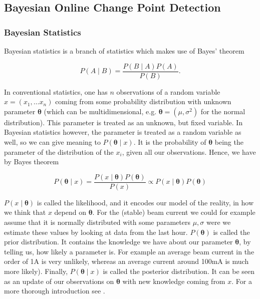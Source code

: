 \documentclass[12pt,a4paper]{article}
\begin{document}
\hypertarget{bayesian-online-changepoint-detection}{
\subsection{Bayesian Online Change Point Detection}\label{bayesian-online-changepoint-detection}}

\subsubsection{Bayesian Statistics}
Bayesian statistics is a branch of statistics which makes use of Bayes' theorem

\begin{equation*}
P\left(A \mid B\right)=\frac{P\left(B \mid A\right)P\left(A\right)}{P\left(B\right)}.
\end{equation*}

In conventional statistics, one has $n$ observations of a random variable $ x = \left(x_1, \dots x_n\right)$ coming from some probability distribution with unknown parameter $\bm{{\theta}}$ (which can be multidimensional, e.g. $\bm{{\theta}}=\left(\mu, \sigma^2 \right)$ for the normal distribution). This parameter is treated as an unknown, but fixed variable. In Bayesian statistics however, the parameter is treated as a random variable as well, so we can give meaning to $P\left(\bm{{\theta}} \mid x\right)$. It is the probability of $\bm{{\theta}}$ being the parameter of the distribution of the $x_i$, given all our observations. Hence, we have by Bayes theorem

\begin{equation} \label{eq:posterior_distribution}
	P\left(\bm {{\theta}} \mid x\right)=\frac{P\left(x \mid \bm{{\theta}}\right)P\left(\bm {{\theta}}\right)}{P\left(x\right)} \propto P\left(x \mid \bm{{\theta}}\right)P\left(\bm {{\theta}}\right)
\end{equation}

$P\left(x \mid \bm{{\theta}}\right)$ is called the likelihood, and it encodes our model of the reality, in how we think that $x$ depend on $\bm{{\theta}}$. For the (stable) beam current we could for example assume that it is normally distributed with some parameters $\mu, \sigma$ were we estimate these values by looking at data from the last hour. $P\left(\bm {{\theta}}\right)$ is called the prior distribution. It contains the knowledge we have about our parameter $\bm{{\theta}}$, by telling us, how likely a parameter is. For example an average beam current in the order of 1A is very unlikely, whereas an average current around 100mA is much more likely).  Finally, $P\left(\bm {{\theta}} \mid x\right)$ is called the posterior distribution. It can be seen as an update of our observations on $\bm{{\theta}}$ with new knowledge coming from $x$. For a more thorough introduction see \cite{Spiegelhalter:Bayesianstatistics,Brooks-Bartlett:Probabilityconceptsexplained}.
\end{document}
